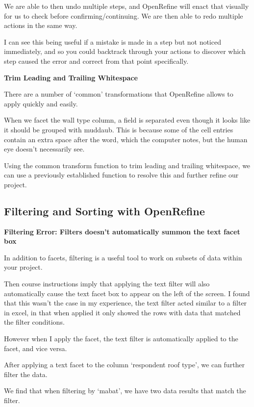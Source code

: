 \documentclass{article}
\begin{document}
We are able to then undo multiple steps, and OpenRefine will enact that visually for us to check before confirming/continuing. We are then able to redo multiple actions in the same way. 

I can see this being useful if a mistake is made in a step but not noticed immediately, and so you could backtrack through your actions to discover which step caused the error and correct from that point specifically.

\textbf{Trim Leading and Trailing Whitespace}

There are a number of `common' transformations that OpenRefine allows to apply quickly and easily.

When we facet the wall type column, a field is separated even though it looks like it should be grouped with muddaub. This is because some of the cell entries contain an extra space after the word, which the computer notes, but the human eye doesn't necessarily see. 

Using the common transform function to trim leading and trailing whitespace, we can use a previously established function to resolve this and further refine our project.

\subsection{Filtering and Sorting with OpenRefine}

\textbf{Filtering}
\textbf{Error: Filters doesn't automatically summon the text facet box}
\label{Error: Filter doesn't automatically summon the text facet box}

In addition to facets, filtering is a useful tool to work on subsets of data within your project.

Then course instructions imply that applying the text filter will also automatically cause the text facet box to appear on the left of the screen. I found that this wasn't the case in my experience, the text filter acted similar to a filter in excel, in that when applied it  only showed the rows with data that matched the filter conditions. 

However when I apply the facet, the text filter is automatically applied to the facet, and vice versa.

After applying a text facet to the column `respondent roof type', we can further filter the data.

We find that when filtering by `mabat', we have two data results that match the filter. 
\end{document}
